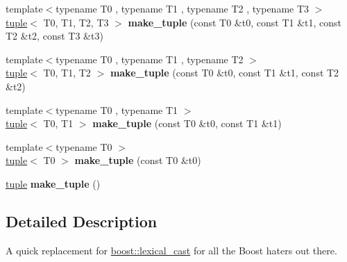 \begin{DoxyCompactItemize}
\item 
\hypertarget{namespaceboost_ae49cd6703339d58fb2b70acbc5ef6797}{{\footnotesize template$<$typename T0 , typename T1 , typename T2 , typename T3 $>$ }\\\hyperlink{classboost_1_1tuple}{tuple}$<$ T0, T1, T2, T3 $>$ {\bfseries make\+\_\+tuple} (const T0 \&t0, const T1 \&t1, const T2 \&t2, const T3 \&t3)}\label{namespaceboost_ae49cd6703339d58fb2b70acbc5ef6797}

\item 
\hypertarget{namespaceboost_a6e452ad03540572af9477b70c72de6e9}{{\footnotesize template$<$typename T0 , typename T1 , typename T2 $>$ }\\\hyperlink{classboost_1_1tuple}{tuple}$<$ T0, T1, T2 $>$ {\bfseries make\+\_\+tuple} (const T0 \&t0, const T1 \&t1, const T2 \&t2)}\label{namespaceboost_a6e452ad03540572af9477b70c72de6e9}

\item 
\hypertarget{namespaceboost_a9497498285811bc4e31901ec7cb1cffa}{{\footnotesize template$<$typename T0 , typename T1 $>$ }\\\hyperlink{classboost_1_1tuple}{tuple}$<$ T0, T1 $>$ {\bfseries make\+\_\+tuple} (const T0 \&t0, const T1 \&t1)}\label{namespaceboost_a9497498285811bc4e31901ec7cb1cffa}

\item 
\hypertarget{namespaceboost_a44ee2e52265015ee5f0251560d18b459}{{\footnotesize template$<$typename T0 $>$ }\\\hyperlink{classboost_1_1tuple}{tuple}$<$ T0 $>$ {\bfseries make\+\_\+tuple} (const T0 \&t0)}\label{namespaceboost_a44ee2e52265015ee5f0251560d18b459}

\item 
\hypertarget{namespaceboost_a91e85fa38cb6e67d1878f470450c3212}{\hyperlink{classboost_1_1tuple}{tuple} {\bfseries make\+\_\+tuple} ()}\label{namespaceboost_a91e85fa38cb6e67d1878f470450c3212}

\end{DoxyCompactItemize}


\subsection{Detailed Description}
A quick replacement for \hyperlink{namespaceboost_a19d97ff5320962433a8d0ca7c6e2ad41}{boost\+::lexical\+\_\+cast} for all the Boost haters out there. 
